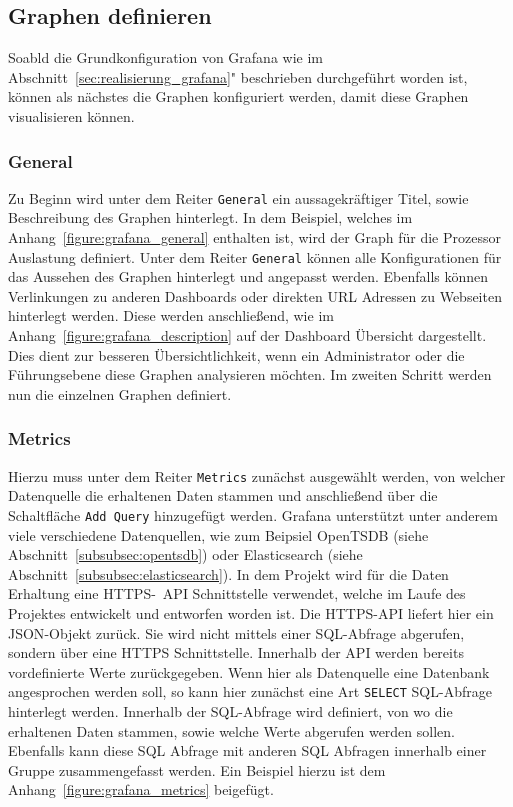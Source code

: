 {\subsection{Graphen definieren}
\label{subsec:graphen-definieren}
Soabld die Grundkonfiguration von Grafana wie im
Abschnitt~\ref{sec:realisierung_grafana}" beschrieben durchgeführt worden ist,
können als nächstes die Graphen konfiguriert werden, damit diese Graphen
visualisieren können.
\mr%

\subsubsection{General}
Zu Beginn wird unter dem Reiter \texttt{General} ein aussagekräftiger Titel,
sowie Beschreibung des Graphen hinterlegt. In dem Beispiel, welches im
Anhang~\ref{figure:grafana_general} enthalten ist, wird der Graph für die
Prozessor Auslastung definiert. Unter dem Reiter \texttt{General} können alle
Konfigurationen für das Aussehen des Graphen hinterlegt und angepasst werden.
Ebenfalls können Verlinkungen zu anderen Dashboards oder direkten URL Adressen
zu Webseiten hinterlegt werden. Diese werden anschließend, wie im
Anhang~\ref{figure:grafana_description} auf der Dashboard Übersicht
dargestellt. Dies dient zur besseren Übersichtlichkeit, wenn ein Administrator
oder die Führungsebene diese Graphen analysieren möchten. Im zweiten Schritt
werden nun die einzelnen Graphen definiert.
\mr%

\subsubsection{Metrics}
Hierzu muss unter dem Reiter \texttt{Metrics} zunächst ausgewählt werden, von
welcher Datenquelle die erhaltenen Daten stammen und anschließend über die
Schaltfläche \texttt{Add Query} hinzugefügt werden. Grafana unterstützt unter
anderem viele verschiedene Datenquellen, wie zum Beipsiel OpenTSDB (siehe
Abschnitt~\ref{subsubsec:opentsdb}) oder Elasticsearch (siehe
Abschnitt~\ref{subsubsec:elasticsearch}). In dem Projekt wird für die Daten
Erhaltung eine HTTPS-~\gls{API} Schnittstelle verwendet, welche im Laufe des
Projektes entwickelt und entworfen worden ist. Die HTTPS-API liefert hier ein
\gls{JSON}-Objekt zurück. Sie wird nicht mittels einer SQL-Abfrage abgerufen,
sondern über eine \gls{HTTPS} Schnittstelle. Innerhalb der API werden bereits
vordefinierte Werte zurückgegeben. Wenn hier als Datenquelle eine Datenbank
angesprochen werden soll, so kann hier zunächst eine Art \texttt{SELECT}
\gls{SQL}-Abfrage hinterlegt werden. Innerhalb der SQL-Abfrage wird definiert,
von wo die erhaltenen Daten stammen, sowie welche Werte abgerufen werden
sollen. Ebenfalls kann diese SQL Abfrage mit anderen SQL Abfragen innerhalb
einer Gruppe zusammengefasst werden. Ein Beispiel hierzu ist dem
Anhang~\ref{figure:grafana_metrics} beigefügt.
\mr%

}
